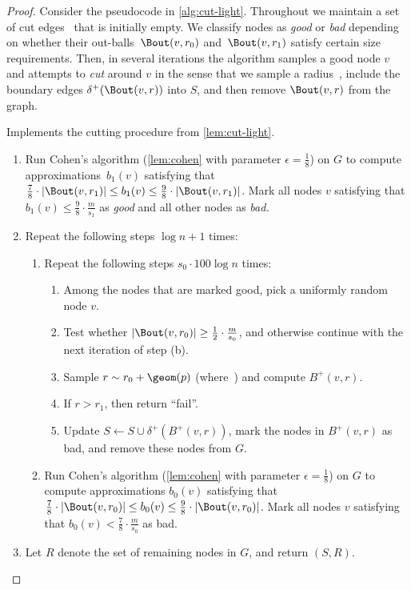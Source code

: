 \begin{proof}
Consider the pseudocode in \cref{alg:cut-light}. Throughout we maintain a set of cut edges~ that is initially empty. We classify nodes as \emph{good} or \emph{bad} depending on whether their out-balls~$\Bout(v, r_0)$ and~$\Bout(v, r_1)$ satisfy certain size requirements. Then, in several iterations the algorithm samples a good node $v$ and attempts to \emph{cut} around $v$ in the sense that we sample a radius~, include the boundary edges $\delta^+(\Bout(v, r))$ into $S$, and then remove $\Bout(v, r)$ from the graph.

\begin{algorithm}[t]
\caption{Implements the cutting procedure from \cref{lem:cut-light}.} \label{alg:cut-light}
\begin{enumerate}[label=\arabic*.]
    \item Run Cohen's algorithm (\cref{lem:cohen} with parameter $\epsilon = \frac18$) on $G$ to compute approximations~$b_1(v)$ satisfying that $\tfrac78 \cdot |\Bout(v, r_1)| \leq b_1(v) \leq \tfrac98 \cdot |\Bout(v, r_1)|$. Mark all nodes $v$ satisfying that $b_1(v) \leq \frac98 \cdot \frac{m}{s_1}$ as \emph{good} and all other nodes as \emph{bad.}
    \item Repeat the following steps $\log n + 1$ times:
    \begin{enumerate}[label=2.\arabic*.]
        \item Repeat the following steps $s_0 \cdot 100 \log n$ times:
        \begin{enumerate}[label=2.1.\arabic*.]
            \item Among the nodes that are marked good, pick a uniformly random node $v$.
            \item Test whether $|\Bout(v, r_0)| \geq \frac{1}{2} \cdot \frac{m}{s_0}$, and otherwise continue with the next iteration of step (b).
            \item Sample $r \sim r_0 + \geom(p)$ (where~) and compute $B^+(v, r)$.
            \item If $r > r_1$, then return ``fail''.
            \item Update $S \gets S \cup \delta^+(B^+(v, r))$, mark the nodes in $B^+(v, r)$ as bad, and remove these nodes from $G$.
        \end{enumerate}
        \item Run Cohen's algorithm (\cref{lem:cohen} with parameter $\epsilon = \frac18$) on $G$ to compute approximations $b_0(v)$ satisfying that $\tfrac78 \cdot |\Bout(v, r_0)| \leq b_0(v) \leq \tfrac98 \cdot |\Bout(v, r_0)|$. Mark all nodes $v$ satisfying that $b_0(v) < \frac78 \cdot \frac{m}{s_0}$ as bad.
    \end{enumerate}
    \item Let $R$ denote the set of remaining nodes in $G$, and return $(S, R)$.
\end{enumerate}
\end{algorithm}


\end{proof}
